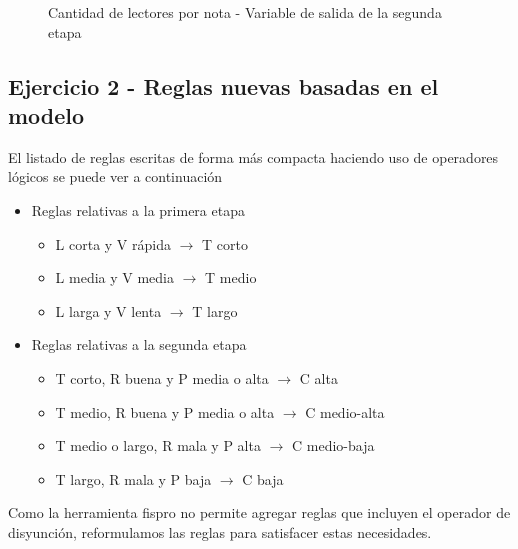 \documentclass{article}
\begin{document}
\begin{figure}[H]
	\centering
	\caption{Cantidad de lectores por nota - Variable de salida de la segunda etapa}
	\label{fig:etapa2-salida}
\end{figure}

\pagebreak
\subsection*{Ejercicio 2 - Reglas nuevas basadas en el modelo}
El listado de reglas escritas de forma más compacta haciendo uso de operadores lógicos se puede ver a continuación

\begin{itemize}
	\item Reglas relativas a la primera etapa
	\begin{itemize}
		\item L corta y V rápida $\rightarrow$ T corto
		\item L media y V media $\rightarrow$ T medio
		\item L larga y V lenta $\rightarrow$ T largo
	\end{itemize}
	\item Reglas relativas a la segunda etapa
	\begin{itemize}
		\item T corto, R buena y P media o alta $\rightarrow$ C alta
		\item T medio, R buena y P media o alta $\rightarrow$ C medio-alta
		\item T medio o largo, R mala y P alta $\rightarrow$ C medio-baja
		\item T largo, R mala y P baja $\rightarrow$ C baja
	\end{itemize}
\end{itemize}

Como la herramienta fispro no permite agregar reglas que incluyen el operador de disyunción, reformulamos las reglas para satisfacer estas necesidades.
\end{document}
